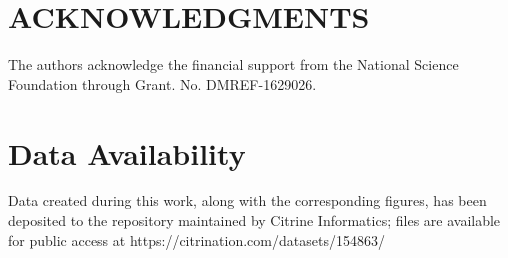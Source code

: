 \section{ACKNOWLEDGMENTS}
The authors acknowledge the financial support from the National Science Foundation through Grant. No. DMREF-1629026.

\section{Data Availability}
Data created during this work, along with the corresponding figures, has been deposited to the
repository maintained by Citrine Informatics; files are available for public access\cite{CITRINE} at https://citrination.com/datasets/154863/


%



% 
% 
% 
% 
% 
% 
% 
% 
% 
% 
% 
% 

%

